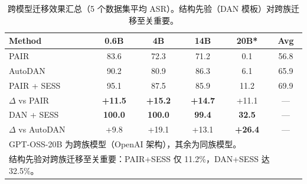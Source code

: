 \begin{table}[p]
\centering
\caption{跨模型迁移效果汇总（5 个数据集平均 ASR）。结构先验（DAN 模板）对跨族迁移至关重要。}
\label{tab:transfer_summary}
\small
\begin{tabular}{lccccc}
\toprule
\textbf{Method} & \textbf{0.6B} & \textbf{4B} & \textbf{14B} & \textbf{20B*} & \textbf{Avg} \\
\midrule
PAIR & 83.6 & 72.3 & 71.2 & 0.1 & 56.8 \\
AutoDAN & 90.2 & 80.9 & 86.3 & 6.1 & 65.9 \\
\midrule
PAIR + SESS & 95.1 & 87.5 & 85.9 & 11.2 & 69.9 \\
$\Delta$ vs PAIR & \textbf{+11.5} & \textbf{+15.2} & \textbf{+14.7} & +11.1 & --- \\
\midrule
DAN + SESS & \textbf{100.0} & \textbf{100.0} & \textbf{99.4} & \textbf{32.5} & --- \\
$\Delta$ vs AutoDAN & +9.8 & +19.1 & +13.1 & \textbf{+26.4} & --- \\
\bottomrule
\multicolumn{6}{l}{\small *GPT-OSS-20B 为跨族模型（OpenAI 架构），其余为同族模型。} \\
\multicolumn{6}{l}{\small 结构先验对跨族迁移至关重要：PAIR+SESS 仅 11.2\%，DAN+SESS 达 32.5\%。} \\
\end{tabular}
\end{table}

%
